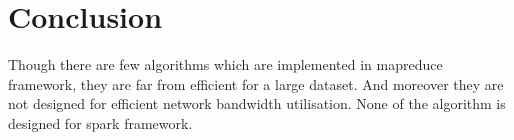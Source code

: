 \documentclass[conference]{IEEEtran}
\begin{document}
%



\bigskip

\section{Conclusion}

Though there are few algorithms which are implemented in mapreduce
framework, they are far from efficient for a large dataset. And
moreover they are not designed for efficient network bandwidth
utilisation. None of the algorithm is designed for spark framework.

\end{document}

